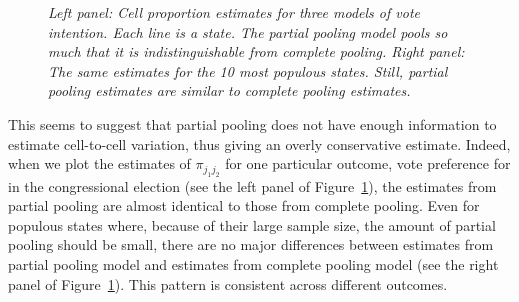 \documentclass[sii]{ipart}
\begin{document}
\begin{figure}
  \centering
  \caption{\em Left panel: Cell proportion estimates for three models of vote
    intention. Each line is a state. The
    partial pooling model pools so much that it is indistinguishable from
    complete pooling. Right panel: The same estimates for the 10 most populous
    states. Still, partial pooling estimates are similar to complete pooling
    estimates.}
  \label{fig:234}
\end{figure}

This seems to suggest that partial pooling does not have enough information to
estimate cell-to-cell variation, thus giving an overly conservative
estimate. Indeed, when we plot the estimates of $\pi_{j_1j_2}$ for one particular
outcome, vote preference for in the congressional election (see the left panel of
Figure~\ref{fig:234}), the estimates from partial pooling are almost identical to
those from complete pooling. Even for populous states where, because of their
large sample size, the amount of partial pooling should be small, there are no
major differences between estimates from partial pooling model and estimates from
complete pooling model (see the right panel of Figure~\ref{fig:234}). This
pattern is consistent across different outcomes.
\end{document}
